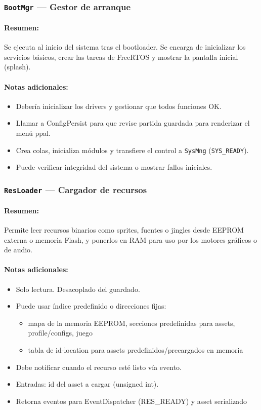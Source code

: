\documentclass[11pt,a4paper]{article}
\begin{document}
\subsubsection{\texttt{BootMgr} — Gestor de arranque}
\paragraph{Resumen:} Se ejecuta al inicio del sistema tras el bootloader. Se encarga de inicializar los servicios básicos, crear las tareas de FreeRTOS y mostrar la pantalla inicial (splash).
\paragraph{Notas adicionales:}
\begin{itemize}
  \item Debería inicializar los drivers y gestionar que todos funciones OK.
  \item Llamar a ConfigPersist para que revise partida guardada para renderizar el menú ppal.
  \item Crea colas, inicializa módulos y transfiere el control a \texttt{SysMng} (\texttt{SYS\_READY}).
  \item Puede verificar integridad del sistema o mostrar fallos iniciales.
\end{itemize}

\subsubsection{\texttt{ResLoader} — Cargador de recursos}
\paragraph{Resumen:} Permite leer recursos binarios como sprites, fuentes o jingles desde EEPROM externa o memoria Flash, y ponerlos en RAM para uso por los motores gráficos o de audio.
\paragraph{Notas adicionales:}
\begin{itemize}
  \item Solo lectura. Desacoplado del guardado.
  \item Puede usar índice predefinido o direcciones fijas:
  \begin{itemize}
    \item mapa de la memoria EEPROM, secciones predefinidas para assets, profile/configs, juego
    \item tabla de id-location para assets predefinidos/precargados en memoria
  \end{itemize}
  \item Debe notificar cuando el recurso esté listo vía evento.
  \item Entradas: id del asset a cargar (unsigned int).
  \item Retorna eventos para EventDispatcher (RES\_READY) y asset serializado
\end{itemize}
\end{document}
